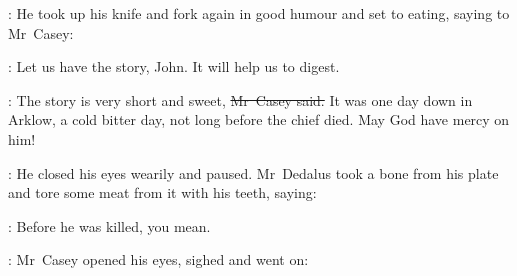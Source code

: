 :
He took up his knife and fork again
in good humour
and set to eating,
saying to Mr~Casey:

\simon:
Let us have the story, John.
It will help us to digest.


\begin{comment}

    \N2:
    Stephen looked with affection
    at Mr~Casey’s face
    which stared across the table over his joined hands.
    He liked to sit near him at the fire,
    looking up at his dark fierce face.
    But his dark eyes were never fierce
    and his slow voice was good to listen to.
    But why was he then against the priests?
    Because Dante must be right then.
    But he had heard his father say
    that she was a spoiled nun
    and that she had come out of the convent in the Alleghanies
    when her brother had got the money from the savages
    for the trinkets and the chainies.
    Perhaps that made her severe against Parnell.
    And she did not like him to play with Eileen
    because Eileen was a protestant
    and when she was young
    she knew children that used to play with protestants
    and the protestants used to make fun
    of the litany of the Blessed Virgin.
    Tower of Ivory,
    they used to say,
    House of Gold!

    \StephenInt:
    How could a woman be a tower of ivory
    or a house of gold?
    Who was right then?

    \N2:
    And he remembered the evening in the infirmary in Clongowes,
    the dark waters,
    the light at the pierhead
    and the moan of sorrow from the people when they had heard.

    \StephenInt:
    Eileen had long white hands.
    One evening
    when playing tig
    she had put her hands over his eyes:
    long and white and thin and cold and soft.
    That was ivory: a cold white thing.
    That was the meaning of Tower of Ivory.

\end{comment}


\casey:
The story is very short and sweet,
\sout{Mr~Casey said.}
It was one day down in Arklow,
a cold bitter day,
not long before the chief died.
May God have mercy on him!

:
He closed his eyes wearily and paused.
Mr~Dedalus took a bone from his plate
and tore some meat from it with his teeth,
saying:

\simon:
Before he was killed,
you mean.

:
Mr~Casey opened his eyes,
sighed
and went on:

